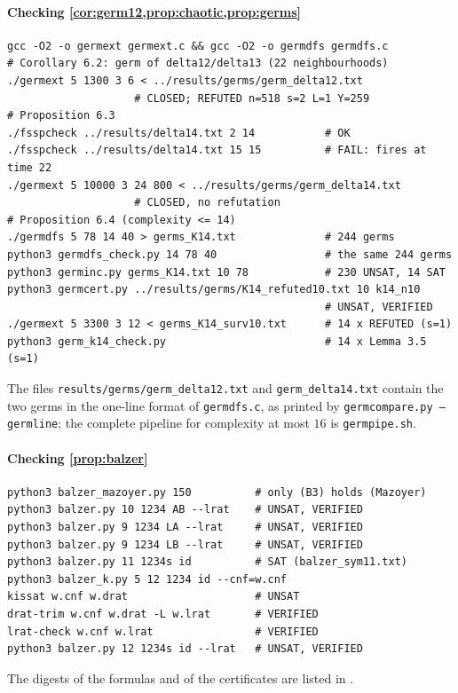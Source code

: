 \paragraph{Checking \cref{cor:germ12,prop:chaotic,prop:germs}}
{\footnotesize
\begin{verbatim}
gcc -O2 -o germext germext.c && gcc -O2 -o germdfs germdfs.c
# Corollary 6.2: germ of delta12/delta13 (22 neighbourhoods)
./germext 5 1300 3 6 < ../results/germs/germ_delta12.txt
                    # CLOSED; REFUTED n=518 s=2 L=1 Y=259
# Proposition 6.3
./fsspcheck ../results/delta14.txt 2 14           # OK
./fsspcheck ../results/delta14.txt 15 15          # FAIL: fires at time 22
./germext 5 10000 3 24 800 < ../results/germs/germ_delta14.txt
                    # CLOSED, no refutation
# Proposition 6.4 (complexity <= 14)
./germdfs 5 78 14 40 > germs_K14.txt              # 244 germs
python3 germdfs_check.py 14 78 40                 # the same 244 germs
python3 germinc.py germs_K14.txt 10 78            # 230 UNSAT, 14 SAT
python3 germcert.py ../results/germs/K14_refuted10.txt 10 k14_n10
                                                  # UNSAT, VERIFIED
./germext 5 3300 3 12 < germs_K14_surv10.txt      # 14 x REFUTED (s=1)
python3 germ_k14_check.py                         # 14 x Lemma 3.5 (s=1)
\end{verbatim}}
The files \texttt{results/germs/germ\_delta12.txt} and
\texttt{germ\_delta14.txt} contain the two germs in the one-line format of
\texttt{germdfs.c}, as printed by \texttt{germcompare.py --germline}; the
complete pipeline for complexity at most $16$ is \texttt{germpipe.sh}.

\paragraph{Checking \cref{prop:balzer}}
{\footnotesize
\begin{verbatim}
python3 balzer_mazoyer.py 150          # only (B3) holds (Mazoyer)
python3 balzer.py 10 1234 AB --lrat    # UNSAT, VERIFIED
python3 balzer.py 9 1234 LA --lrat     # UNSAT, VERIFIED
python3 balzer.py 9 1234 LB --lrat     # UNSAT, VERIFIED
python3 balzer.py 11 1234s id          # SAT (balzer_sym11.txt)
python3 balzer_k.py 5 12 1234 id --cnf=w.cnf
kissat w.cnf w.drat                    # UNSAT
drat-trim w.cnf w.drat -L w.lrat       # VERIFIED
lrat-check w.cnf w.lrat                # VERIFIED
python3 balzer.py 12 1234s id --lrat   # UNSAT, VERIFIED
\end{verbatim}}
The digests of the formulas and of the certificates are listed in
.

